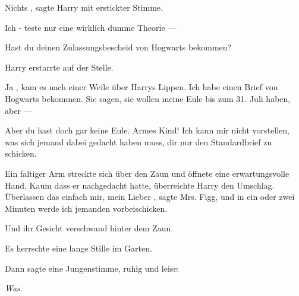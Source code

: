 \glqq Nichts\grqq{} , sagte Harry mit erstickter Stimme.

\glqq Ich - teste nur eine wirklich dumme Theorie ---\grqq{}

\glqq Hast du deinen Zulassungsbescheid von Hogwarts bekommen?\grqq{}

Harry erstarrte auf der Stelle.

\glqq Ja\grqq{} , kam es nach einer Weile über Harrys Lippen. \glqq Ich habe einen Brief von
Hogwarts bekommen. Sie sagen, sie wollen meine Eule bis zum 31. Juli haben, aber
---\grqq{}

\glqq Aber du hast doch gar keine Eule. Armes Kind! Ich kann mir nicht vorstellen,
was sich jemand dabei gedacht haben muss, dir nur den Standardbrief zu
schicken.\grqq{}

Ein faltiger Arm streckte sich über den Zaun und öffnete eine erwartungsvolle
Hand. Kaum dass er nachgedacht hatte, überreichte Harry den Umschlag.
\glqq Überlassen das einfach mir, mein Lieber\grqq{} , sagte Mrs. Figg, \glqq und in ein oder
zwei Minuten werde ich jemanden vorbeischicken.\grqq{}

Und ihr Gesicht verschwand hinter dem Zaun.

Es herrschte eine lange Stille im Garten.

Dann sagte eine Jungenstimme, ruhig und leise:

\glqq \emph{Was}.\grqq{}
